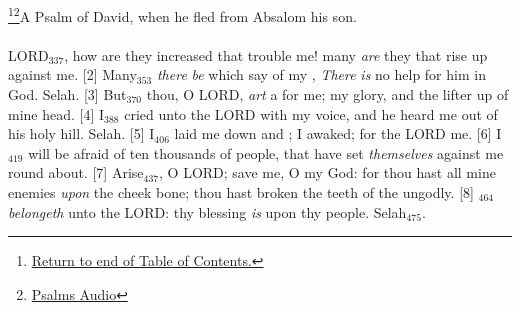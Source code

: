 
\footnote{\textcolor[cmyk]{0.99998,1,0,0}{\hyperlink{TOC}{Return to end of Table of Contents.}}}\footnote{\href{https://www.audioverse.org/english/audiobibles/books/ENGKJV/O/Ps/1}{\textcolor[cmyk]{0.99998,1,0,0}{Psalms Audio}}}\textcolor[cmyk]{0.99998,1,0,0}{A Psalm of David, when he fled from Absalom his son.}\\
\\
\textcolor[cmyk]{0.99998,1,0,0}{LORD\textcolor{jungle}{$_{337}$}, how are they increased that trouble me! many \emph{are} they that rise up against me.}
[2] \textcolor[cmyk]{0.99998,1,0,0}{Many\textcolor{jungle}{$_{353}$} \emph{there} \emph{be} which say of my , \emph{There} \emph{is} no help for him in God. Selah.}
[3] \textcolor[cmyk]{0.99998,1,0,0}{But\textcolor{jungle}{$_{370}$} thou, O LORD, \emph{art} a  for me; my glory, and the lifter up of mine head.}
[4] \textcolor[cmyk]{0.99998,1,0,0}{I\textcolor{jungle}{$_{388}$} cried unto the LORD with my voice, and he heard me out of his holy hill. Selah.}
[5] \textcolor[cmyk]{0.99998,1,0,0}{I\textcolor{jungle}{$_{406}$} laid me down and ; I awaked; for the LORD  me.}
[6] \textcolor[cmyk]{0.99998,1,0,0}{I\textcolor{jungle}{$_{419}$} will  be afraid of ten thousands of people, that have set \emph{themselves} against me round about.}
[7] \textcolor[cmyk]{0.99998,1,0,0}{Arise\textcolor{jungle}{$_{437}$}, O LORD; save me, O my God: for thou hast  all mine enemies \emph{upon} the cheek bone; thou hast broken the teeth of the ungodly.}
[8] \textcolor[cmyk]{0.99998,1,0,0}{\textcolor{jungle}{$_{464}$} \emph{belongeth} unto the LORD: thy blessing \emph{is} upon thy people. Selah\textcolor{jungle}{$_{475}$}.}


